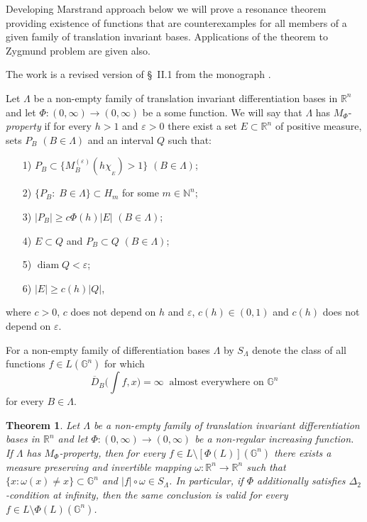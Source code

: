 \documentclass[12pt,reqno]{article}
\newtheorem{theorem}{Theorem}
\theoremstyle{remark}
\newcommand{\diam}{\operatorname{diam}}
\begin{document}
Developing Marstrand approach below we will prove a resonance  theorem providing existence of functions that are counterexamples for all members of a given family of translation invariant bases. Applications of the theorem to Zygmund problem are given also.

The work is a revised version of \S~II.1 from the monograph \cite{5}.

Let $\Lambda$ be a non-empty family of translation invariant differentiation bases in $\mathbb{R}^n$ and let $\Phi: (0,\infty)\to (0,\infty)$ be a some function. We will say that $\Lambda$ has $M_\Phi$-\emph{property} if for every $h>1$ and $\varepsilon>0$ there exist a set $E\subset\mathbb{R}^n$ of positive measure, sets $P_B$ $(B\in\Lambda)$ and an interval $Q$ such that:
\begin{itemize}
\item[1)] $P_B\subset\{M_B^{(\varepsilon)}(h\chi_{{}_E})>1\}$ $(B\in\Lambda)$;

\item[2)] $\{P_B:\;B\in\Lambda\}\subset H_m$ for some $m\in\mathbb{N}^n$;

\item[3)] $|P_B|\geq c\Phi(h)|E|$ $(B\in\Lambda)$;

\item[4)] $E\subset Q$ and $P_B\subset Q$ $(B\in\Lambda)$;

\item[5)] $\diam Q<\varepsilon$;

\item[6)] $|E|\geq c(h)|Q|$,
\end{itemize}
where $c>0$, $c$ does not depend on $h$ and $\varepsilon$, $c(h)\in(0,1)$ and $c(h)$ does not depend on $\varepsilon$.

For a non-empty family of differentiation bases $\Lambda$ by $S_\Lambda$ denote the class of all functions $f\in L(\mathbb{G}^n)$ for which
$$  \overline{D}_B\Big(\int f,x\Big)=\infty \;\;\text{almost everywhere on $\mathbb{G}^n$}  $$
for every $B\in\Lambda$.

\begin{theorem}\label{th:1}
Let $\Lambda$ be a non-empty family of translation invariant differentiation bases in $\mathbb{R}^n$ and let $\Phi: (0,\infty)\rightarrow (0,\infty)$ be a non-regular increasing function.  If $\Lambda$ has $M_\Phi$-property, then for every  $f\in L\setminus [\Phi(L)](\mathbb{G}^n)$   there exists a measure preserving and invertible mapping $\omega:\mathbb{R}^n\to\mathbb{R}^n$ such that  $\{x:\omega(x)\neq x\}\subset \mathbb{G}^n$ and $|f|\circ\omega\in S_\Lambda$. In particular, if $\Phi$ additionally satisfies $\Delta_2$-condition at infinity, then the same conclusion is valid for every $f\in L\setminus \Phi(L)(\mathbb{G}^n)$.
\end{theorem}
\end{document}
